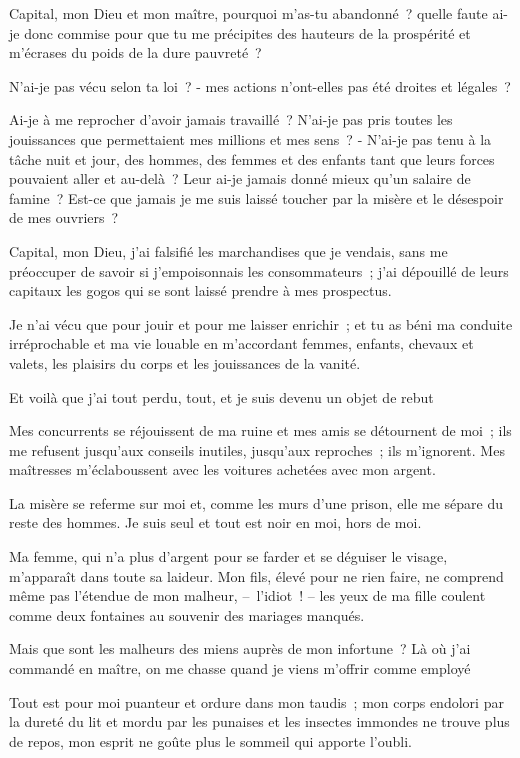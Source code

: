 \documentclass[french,twoside]{book} %
\begin{document}
\noindent Capital, mon Dieu et mon maître, pourquoi m’as-tu abandonné ? quelle faute ai-je donc commise pour que tu me précipites des hauteurs de la prospérité et m’écrases du poids de la dure pauvreté ?\par
N'ai-je pas vécu selon ta loi ? - mes actions n’ont-elles pas été droites et légales ?\par
Ai-je à me reprocher d’avoir jamais travaillé ? N'ai-je pas pris toutes les jouissances que permettaient mes millions et mes sens ? - N'ai-je pas tenu à la tâche nuit et jour, des hommes, des femmes et des enfants tant que leurs forces pouvaient aller et au-delà ? Leur ai-je jamais donné mieux qu’un salaire de famine ? Est-ce que jamais je me suis laissé toucher par la misère et le désespoir de mes ouvriers ?\par
Capital, mon Dieu, j’ai falsifié les marchandises que je vendais, sans me préoccuper de savoir si j’empoisonnais les consommateurs ; j’ai dépouillé de leurs capitaux les gogos qui se sont laissé prendre à mes prospectus.\par
Je n’ai vécu que pour jouir et pour me laisser enrichir ; et tu as béni ma conduite irréprochable et ma vie louable en m’accordant femmes, enfants, chevaux et valets, les plaisirs du corps et les jouissances de la vanité.\par
Et voilà que j’ai tout perdu, tout, et je suis devenu un objet de rebut\par
Mes concurrents se réjouissent de ma ruine et mes amis se détournent de moi ; ils me refusent jusqu’aux conseils inutiles, jusqu’aux reproches ; ils m’ignorent. Mes maîtresses m’éclaboussent avec les voitures achetées avec mon argent.\par
La misère se referme sur moi et, comme les murs d’une prison, elle me sépare du reste des hommes. Je suis seul et tout est noir en moi, hors de moi.\par
Ma femme, qui n’a plus d’argent pour se farder et se déguiser le visage, m’apparaît dans toute sa laideur. Mon fils, élevé pour ne rien faire, ne comprend même pas l’étendue de mon malheur, – l’idiot ! – les yeux de ma fille coulent comme deux fontaines au souvenir des mariages manqués.\par
Mais que sont les malheurs des miens auprès de mon infortune ? Là où j’ai commandé en maître, on me chasse quand je viens m’offrir comme employé\par
Tout est pour moi puanteur et ordure dans mon taudis ; mon corps endolori par la dureté du lit et mordu par les punaises et les insectes immondes ne trouve plus de repos, mon esprit ne goûte plus le sommeil qui apporte l’oubli.\par
\end{document}
